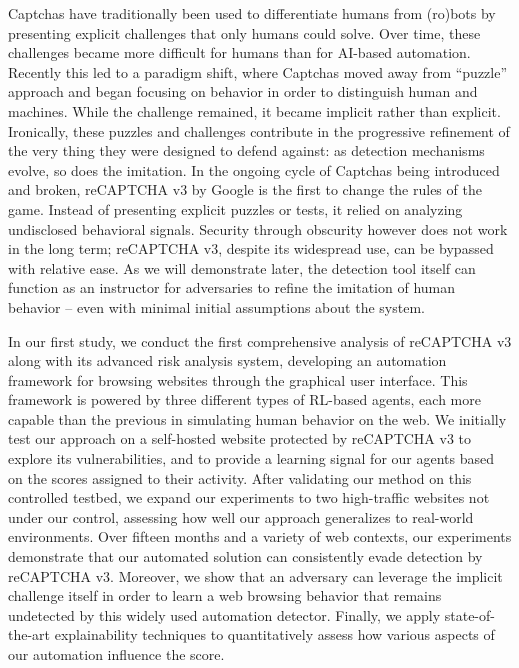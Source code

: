 Captchas have traditionally been used to differentiate humans from (ro)bots by presenting explicit challenges that only humans could solve.
Over time, these challenges became more difficult for humans than for AI-based automation.
Recently this led to a paradigm shift, where Captchas moved away from ``puzzle'' approach and began focusing on behavior in order to distinguish human and machines.
While the challenge remained, it became implicit rather than explicit.
Ironically, these puzzles and challenges contribute in the progressive refinement of the very thing they were designed to defend against: as detection mechanisms evolve, so does the imitation.
In the ongoing cycle of Captchas being introduced and broken, reCAPTCHA v3 by Google is the first to change the rules of the game.
Instead of presenting explicit puzzles or tests, it relied on analyzing undisclosed behavioral signals.
Security through obscurity however does not work in the long term; reCAPTCHA v3, despite its widespread use, can be bypassed with relative ease.
As we will demonstrate later, the detection tool itself can function as an instructor for adversaries to refine the imitation of human behavior -- even with minimal initial assumptions about the system.

In our first study, we conduct the first comprehensive analysis of reCAPTCHA v3 along with its advanced risk analysis system, developing an automation framework for browsing websites through the graphical user interface.
This framework is powered by three different types of RL-based agents, each more capable than the previous in simulating human behavior on the web.
We initially test our approach on a self-hosted website protected by reCAPTCHA v3 to explore its vulnerabilities, and to provide a learning signal for our agents based on the scores assigned to their activity.
After validating our method on this controlled testbed, we expand our experiments to two high-traffic websites not under our control, assessing how well our approach generalizes to real-world environments. 
Over fifteen months and a variety of web contexts, our experiments demonstrate that our automated solution can consistently evade detection by reCAPTCHA v3.
Moreover, we show that an adversary can leverage the implicit challenge itself in order to learn a web browsing behavior that remains undetected by this widely used automation detector.
Finally, we apply state-of-the-art explainability techniques to quantitatively assess how various aspects of our automation influence the score.

